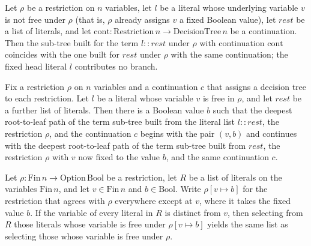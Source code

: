 \begin{lemma}
\label{SwitchingLemma.termSubTree_cons_nonfree}
\leanok
{}
Let $\rho$ be a restriction on $n$ variables, let $l$ be a literal whose underlying
variable $v$ is not free under $\rho$ (that is, $\rho$ already assigns $v$ a fixed
Boolean value), let $\mathit{rest}$ be a list of literals, and let $\mathrm{cont} :
\mathrm{Restriction}\,n \to \mathrm{DecisionTree}\,n$ be a continuation. Then the
sub-tree built for the term $l :: \mathit{rest}$ under $\rho$ with continuation
$\mathrm{cont}$ coincides with the one built for $\mathit{rest}$ under $\rho$ with the
same continuation; the fixed head literal $l$ contributes no branch.
\end{lemma}

\begin{lemma}
\label{SwitchingLemma.termSubTree_deepPath_head_free}
\leanok
{}
Fix a restriction $\rho$ on $n$ variables and a continuation $c$ that assigns a decision
tree to each restriction. Let $l$ be a literal whose variable $v$ is free in $\rho$, and
let $\mathit{rest}$ be a further list of literals. Then there is a Boolean value $b$
such that the deepest root-to-leaf path of the term sub-tree built from the literal list
$l :: \mathit{rest}$, the restriction $\rho$, and the continuation $c$ begins with the
pair $(v, b)$ and continues with the deepest root-to-leaf path of the term sub-tree
built from $\mathit{rest}$, the restriction $\rho$ with $v$ now fixed to the value $b$,
and the same continuation $c$.
\end{lemma}

\begin{lemma}
\label{SwitchingLemma.filter_free_update_eq}
\leanok
{}
Let $\rho : \mathrm{Fin}\,n \to \mathrm{Option}\,\mathrm{Bool}$ be a restriction, let
$R$ be a list of literals on the variables $\mathrm{Fin}\,n$, and let $v \in
\mathrm{Fin}\,n$ and $b \in \mathrm{Bool}$. Write $\rho[v \mapsto b]$ for the
restriction that agrees with $\rho$ everywhere except at $v$, where it takes the fixed
value $b$. If the variable of every literal in $R$ is distinct from $v$, then selecting
from $R$ those literals whose variable is free under $\rho[v \mapsto b]$ yields the same
list as selecting those whose variable is free under $\rho$.
\end{lemma}

